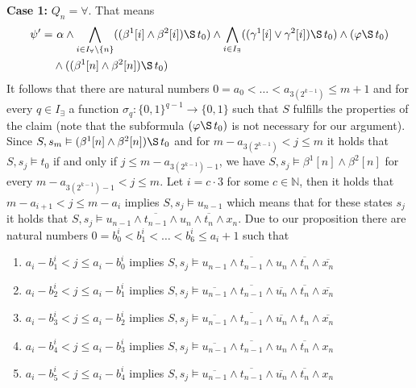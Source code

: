         \begin{EcoEnum}
          \item[\textbf{Case 1:}] $Q_n=\forall$. That means
            \begin{equation*}\begin{split}
              \psi'=& \ \alpha\wedge\bigwedge_{i\in I_{\forall}\setminus\{n\}}((\beta^1[i]\wedge\beta^2[i])\S\, t_0)\wedge \bigwedge_{i\in I_{\exists}}((\gamma^1[i]\vee\gamma^2[i])\S\, t_0)\wedge (\varphi \S\, t_0) \\ &\wedge ((\beta^1[n]\wedge\beta^2[n]) \S\, t_0)
            \end{split}\end{equation*}
            It follows that there are natural numbers $0=a_0<\dots<a_{3(2^{k-1})}\leq m+1$ and for every $q\in I_{\exists}$ a function $\sigma_q:\{0,1\}^{q-1}\rightarrow\{0,1\}$ such that $S$ fulfills the properties of the claim (note that the subformula $(\varphi\S \,t_0)$ is not necessary for our argument). Since $S,s_m\vDash (\beta^1[n]\wedge\beta^2[n]) \S \,t_0$ and for $m-a_{3(2^{k-1})}< j\leq m$ it holds that $S,s_j\vDash t_0$ if and only if $j\leq m-a_{3(2^{k-1})-1}$, we have $S,s_j\vDash \beta^1[n]\wedge\beta^2[n]$ for every $m-a_{3(2^{k-1})-1}< j\leq m$. Let $i=c\cdot3$ for some $c\in\mathbb{N}$, then it holds that $m-a_{i+1}<j\leq m-a_{i}$ implies $S,s_j\vDash u_{n-1}$ which means that for these states $s_j$ it holds that $S,s_j\vDash u_{n-1}\wedge \overline{t_{n-1}}\wedge u_n\wedge \overline{t_n} \wedge x_n$. Due to our proposition there are natural numbers $0=b^i_0<b^i_1<\dots<b^i_6\leq a_i+1$ such that
            \begin{enumerate}[$\bullet$]
\item $a_{i}-b^i_1< j\leq a_{i}-b^i_0$ implies $S,s_j\vDash u_{n-1}\wedge\overline{t_{n-1}}\wedge u_n\wedge\overline{t_n}\wedge \overline{x_n}$
              \item $a_{i}-b^i_2< j\leq a_{i}-b^i_1$ implies $S,s_j\vDash \overline{u_{n-1}}\wedge\overline{t_{n-1}}\wedge\overline{u_n}\wedge\overline{t_n}\wedge \overline{x_n}$
	      \item $a_{i}-b^i_3< j\leq a_{i}-b^i_2$ implies $S,s_j\vDash \overline{u_{n-1}}\wedge\overline{t_{n-1}}\wedge\overline{u_n}\wedge t_n\wedge \overline{x_n}$
              \item $a_{i}-b^i_4< j\leq a_{i}-b^i_3$ implies $S,s_j\vDash \overline{u_{n-1}}\wedge\overline{t_{n-1}}\wedge u_n\wedge\overline{t_n}\wedge x_n$
              \item $a_{i}-b^i_5< j\leq a_{i}-b^i_4$ implies $S,s_j\vDash \overline{u_{n-1}}\wedge\overline{t_{n-1}}\wedge\overline{u_n}\wedge\overline{t_n}\wedge x_n$

\end{enumerate}
\end{EcoEnum}

